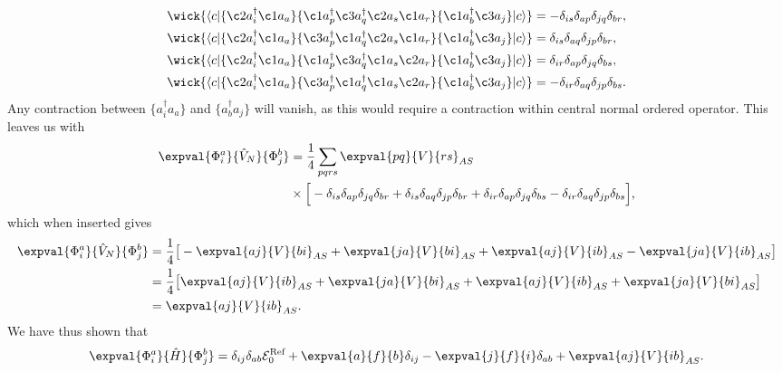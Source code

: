 \begin{align*}
    \wick{
        \langle c \vert
        \{ \c2 a_i^\dagger \c1 a_a \}
        \{ \c1 a_p^\dagger \c3 a_q^\dagger \c2 a_s \c1 a_r \}
        \{ \c1 a_b^\dagger \c3 a_j \}
        \vert c \rangle
    }
    &= -\delta_{is} \delta_{ap} \delta_{jq} \delta_{br}, \\
    \wick{
        \langle c \vert
        \{ \c2 a_i^\dagger \c1 a_a \}
        \{ \c3 a_p^\dagger \c1 a_q^\dagger \c2 a_s \c1 a_r \}
        \{ \c1 a_b^\dagger \c3 a_j \}
        \vert c \rangle
    } &= \delta_{is} \delta_{aq} \delta_{jp} \delta_{br}, \\
    \wick{
        \langle c \vert
        \{ \c2 a_i^\dagger \c1 a_a \}
        \{ \c1 a_p^\dagger \c3 a_q^\dagger \c1 a_s \c2 a_r \}
        \{ \c1 a_b^\dagger \c3 a_j \}
        \vert c \rangle
    } &= \delta_{ir} \delta_{ap} \delta_{jq} \delta_{bs}, \\
    \wick{
        \langle c \vert
        \{ \c2 a_i^\dagger \c1 a_a \}
        \{ \c3 a_p^\dagger \c1 a_q^\dagger \c1 a_s \c2 a_r \}
        \{ \c1 a_b^\dagger \c3 a_j \}
        \vert c \rangle
    } &= -\delta_{ir} \delta_{aq} \delta_{jp} \delta_{bs}.
\end{align*}
Any contraction between $\{a_i^\dagger a_a\}$ and $\{a_b^\dagger a_j\}$ will vanish, as this would require a contraction within central normal ordered operator.
This leaves us with
\begin{align*}
    \expval{\Phi_i^a}{\hat{V}_N}{\Phi_{j}^{b}}
    &= \frac{1}{4} \sum_{pqrs} \expval{pq}{V}{rs}_{AS} \\
    &\times \Big[
        - \delta_{is} \delta_{ap} \delta_{jq} \delta_{br}
        + \delta_{is} \delta_{aq} \delta_{jp} \delta_{br}
        + \delta_{ir} \delta_{ap} \delta_{jq} \delta_{bs}
        - \delta_{ir} \delta_{aq} \delta_{jp} \delta_{bs}
    \Big],
\end{align*}
which when inserted gives
\begin{align*}
    \expval{\Phi_i^a}{\hat{V}_N}{\Phi_{j}^{b}} &= \frac{1}{4} \big[
        -\expval{aj}{V}{bi}_{AS} + \expval{ja}{V}{bi}_{AS} + \expval{aj}{V}{ib}_{AS} - \expval{ja}{V}{ib}_{AS}
    \big] \\
    &= \frac{1}{4} \big[
        \expval{aj}{V}{ib}_{AS} + \expval{ja}{V}{bi}_{AS} + \expval{aj}{V}{ib}_{AS} + \expval{ja}{V}{bi}_{AS}
    \big] \\
    &= \expval{aj}{V}{ib}_{AS}.
\end{align*}
We have thus shown that
\begin{equation}
    \expval{\Phi_i^a}{\hat{H}}{\Phi_{j}^{b}} = \delta_{ij} \delta_{ab} \mathcal{E}_0^{\text{Ref}} + \expval{a}{f}{b} \delta_{ij} - \expval{j}{f}{i} \delta_{ab} + \expval{aj}{V}{ib}_{AS}.
\end{equation}
